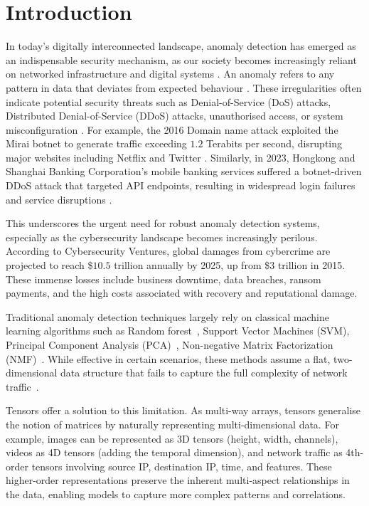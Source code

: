 \documentclass{ieeeaccess}
\begin{document}
\section{Introduction}
In today's digitally interconnected landscape, anomaly detection has emerged as an indispensable security mechanism, as our society becomes increasingly reliant on networked infrastructure and digital systems \cite{rcglobal2021} . An anomaly refers to any pattern in data that deviates from expected behaviour \cite{patcha2007overview}. These irregularities often indicate potential security threats such as Denial-of-Service (DoS) attacks, Distributed Denial-of-Service (DDoS) attacks, unauthorised access, or system misconfiguration \cite{eren2023general}. For example, the 2016 Domain name attack exploited the Mirai botnet to generate traffic exceeding $1.2$ Terabits per second, disrupting major websites including Netflix and Twitter \cite{hilton2016dyn}. Similarly, in 2023, Hongkong and Shanghai Banking Corporation's mobile banking services suffered a botnet-driven DDoS attack that targeted API endpoints, resulting in widespread login failures and service disruptions \cite{paloaltonetworks2024}.

This underscores the urgent need for robust anomaly detection systems, especially as the cybersecurity landscape becomes increasingly perilous. According to Cybersecurity Ventures, global damages from cybercrime are projected to reach  \$$10.5 $ trillion annually by 2025, up from \$$3 $ trillion in 2015. These immense losses include business downtime, data breaches, ransom payments, and the high costs associated with recovery and reputational damage. 

Traditional anomaly detection techniques largely rely on classical machine learning algorithms such as Random forest~\cite{biau2016randomforest}, Support Vector Machines (SVM), Principal Component Analysis (PCA)~\cite{marukatat2022tutorial}, Non-negative Matrix Factorization (NMF)~\cite{lee2000nmf}. While effective in certain scenarios, these methods assume a flat, two-dimensional data structure that fails to capture the full complexity of network traffic~\cite{Su2025Robust}. 

Tensors offer a solution to this limitation. As multi-way arrays, tensors generalise the notion of matrices by naturally representing multi-dimensional data. For example, images can be represented as 3D tensors (height, width, channels), videos as 4D tensors (adding the temporal dimension), and network traffic as 4th-order tensors involving source IP, destination IP, time, and features. These higher-order representations preserve the inherent multi-aspect relationships in the data, enabling models to capture more complex patterns and correlations. 
\end{document}

